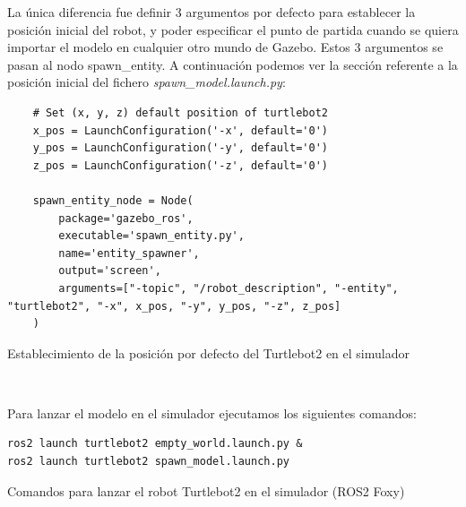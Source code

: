 La única diferencia fue definir 3 argumentos por defecto para establecer la posición inicial del robot, y poder especificar el punto de partida cuando se quiera importar el modelo en cualquier otro mundo de Gazebo. Estos 3 argumentos se pasan al nodo spawn\_entity. A continuación podemos ver la sección referente a la posición inicial del fichero \textit{spawn\_model.launch.py}:\\

\begin{code}[H]
\begin{lstlisting}
	# Set (x, y, z) default position of turtlebot2
	x_pos = LaunchConfiguration('-x', default='0')
	y_pos = LaunchConfiguration('-y', default='0')
	z_pos = LaunchConfiguration('-z', default='0')
	
	spawn_entity_node = Node(
		package='gazebo_ros',
		executable='spawn_entity.py',
		name='entity_spawner',
		output='screen',
		arguments=["-topic", "/robot_description", "-entity", "turtlebot2", "-x", x_pos, "-y", y_pos, "-z", z_pos]
	)
\end{lstlisting}
\caption{Establecimiento de la posición por defecto del Turtlebot2 en el simulador}
\label{cod:posicion_defecto_turtlebot2_simulador}
\end{code}\

Para lanzar el modelo en el simulador ejecutamos los siguientes comandos:\\
\begin{code}[H]
\begin{lstlisting}
ros2 launch turtlebot2 empty_world.launch.py &
ros2 launch turtlebot2 spawn_model.launch.py
\end{lstlisting}
\caption{Comandos para lanzar el robot Turtlebot2 en el simulador (ROS2 Foxy)}
\label{codd:comandos_turtlebot2_simulador}
\end{code}

